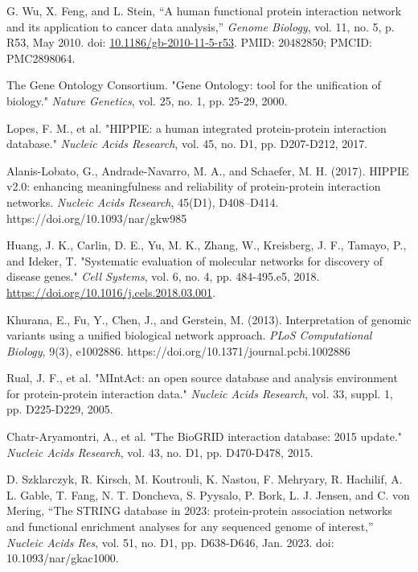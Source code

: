 \documentclass[conference]{IEEEtran}
\begin{document}
\begin{thebibliography}{99}
G. Wu, X. Feng, and L. Stein, ``A human functional protein interaction network and its application to cancer data analysis,'' \textit{Genome Biology}, vol. 11, no. 5, p. R53, May 2010. doi: \url{10.1186/gb-2010-11-5-r53}. PMID: 20482850; PMCID: PMC2898064.

The Gene Ontology Consortium. "Gene Ontology: tool for the unification of biology." \textit{Nature Genetics}, vol. 25, no. 1, pp. 25-29, 2000.

Lopes, F. M., et al. "HIPPIE: a human integrated protein-protein interaction database." \textit{Nucleic Acids Research}, vol. 45, no. D1, pp. D207-D212, 2017.

Alanis-Lobato, G., Andrade-Navarro, M. A., and Schaefer, M. H. (2017). HIPPIE v2.0: enhancing meaningfulness and reliability of protein-protein interaction networks. \textit{Nucleic Acids Research}, 45(D1), D408–D414. https://doi.org/10.1093/nar/gkw985

Huang, J. K., Carlin, D. E., Yu, M. K., Zhang, W., Kreisberg, J. F., Tamayo, P., and Ideker, T. "Systematic evaluation of molecular networks for discovery of disease genes." \textit{Cell Systems}, vol. 6, no. 4, pp. 484-495.e5, 2018. \url{https://doi.org/10.1016/j.cels.2018.03.001}.

Khurana, E., Fu, Y., Chen, J., and Gerstein, M. (2013). Interpretation of genomic variants using a unified biological network approach. \textit{PLoS Computational Biology}, 9(3), e1002886. https://doi.org/10.1371/journal.pcbi.1002886

Rual, J. F., et al. "MIntAct: an open source database and analysis environment for protein-protein interaction data." \textit{Nucleic Acids Research}, vol. 33, suppl. 1, pp. D225-D229, 2005.

Chatr-Aryamontri, A., et al. "The BioGRID interaction database: 2015 update." \textit{Nucleic Acids Research}, vol. 43, no. D1, pp. D470-D478, 2015.

D. Szklarczyk, R. Kirsch, M. Koutrouli, K. Nastou, F. Mehryary, R. Hachilif, A. L. Gable, T. Fang, N. T. Doncheva, S. Pyysalo, P. Bork, L. J. Jensen, and C. von Mering, ``The STRING database in 2023: protein-protein association networks and functional enrichment analyses for any sequenced genome of interest,'' \textit{Nucleic Acids Res}, vol. 51, no. D1, pp. D638-D646, Jan. 2023. doi: 10.1093/nar/gkac1000.



\end{thebibliography}
\end{document}
